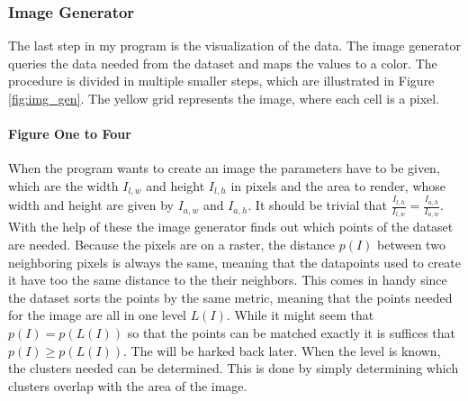 \documentclass[10pt,a4paper,titlepage]{article}
\begin{document}
	\subsubsection{Image Generator}\label{sec:image_generation}
	The last step in my program is the visualization of the data. The image generator queries the data needed from the dataset and maps the values to a color. The procedure is divided in multiple smaller steps, which are illustrated in Figure \ref{fig:img_gen}. The yellow grid represents the image, where each cell is a pixel.\\
	\paragraph{Figure One to Four}
	When the program wants to create an image the parameters have to be given, which are the width \(I_{l,w}\) and height \(I_{l,h}\) in pixels and the area to render, whose width and height are given by \(I_{a,w}\) and \(I_{a,h}\). It should be trivial that \(\frac{I_{l,h}}{I_{l,w}} = \frac{I_{a,h}}{I_{a,w}}\). With the help of these the image generator finds out which points of the dataset are needed. Because the pixels are on a raster, the distance \(p(I)\) between two neighboring pixels is always the same, meaning that the datapoints used to create it have too the same distance to the their neighbors. This comes in handy since the dataset sorts the points by the same metric, meaning that the points needed for the image are all in one level \(L(I)\). While it might seem that \(p(I) = p(L(I))\) so that the points can be matched exactly it is suffices that \(p(I) \geq p(L(I))\). The will be harked back later. When the level is known, the clusters needed can be determined. This is done by simply determining which clusters overlap with the area of the image.
\end{document}
